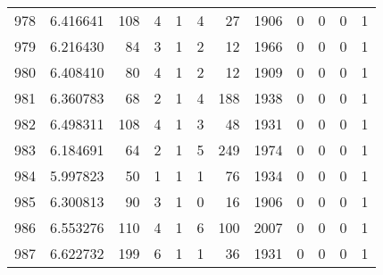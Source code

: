 \begin{tabular}{lrrrrrrrrrrr}
978 &  6.416641 &  108 &      4 &        1 &      4 &              27 &  1906 &               0 &               0 &               0 &               1 \\
979 &  6.216430 &   84 &      3 &        1 &      2 &              12 &  1966 &               0 &               0 &               0 &               1 \\
980 &  6.408410 &   80 &      4 &        1 &      2 &              12 &  1909 &               0 &               0 &               0 &               1 \\
981 &  6.360783 &   68 &      2 &        1 &      4 &             188 &  1938 &               0 &               0 &               0 &               1 \\
982 &  6.498311 &  108 &      4 &        1 &      3 &              48 &  1931 &               0 &               0 &               0 &               1 \\
983 &  6.184691 &   64 &      2 &        1 &      5 &             249 &  1974 &               0 &               0 &               0 &               1 \\
984 &  5.997823 &   50 &      1 &        1 &      1 &              76 &  1934 &               0 &               0 &               0 &               1 \\
985 &  6.300813 &   90 &      3 &        1 &      0 &              16 &  1906 &               0 &               0 &               0 &               1 \\
986 &  6.553276 &  110 &      4 &        1 &      6 &             100 &  2007 &               0 &               0 &               0 &               1 \\
987 &  6.622732 &  199 &      6 &        1 &      1 &              36 &  1931 &               0 &               0 &               0 &               1 \\
\bottomrule
\end{tabular}
